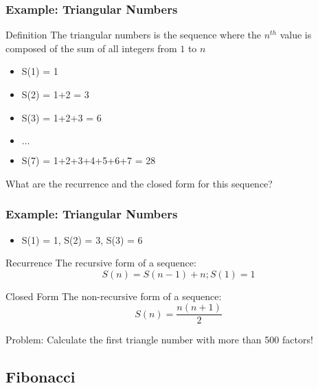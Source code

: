 \documentclass{beamer}
\begin{document}
\begin{frame}
  \frametitle{Example: Triangular Numbers}
  {\smaller
  \begin{block}{Definition}
    The triangular numbers is the sequence where the $n^{th}$ value is
    composed of the sum of all integers from $1$ to $n$
  \end{block}

  \begin{itemize}
  \item S(1) = 1
  \item S(2) = 1+2 = 3
  \item S(3) = 1+2+3 = 6
  \item $\ldots$
  \item S(7) = 1+2+3+4+5+6+7 = 28
  \end{itemize}
  }

  What are the recurrence and the closed form for this sequence?
\end{frame}

\begin{frame}
  \frametitle{Example: Triangular Numbers}
  {\smaller
    \begin{itemize}
    \item S(1) = 1, S(2) = 3, S(3) = 6
    \end{itemize}

    \begin{block}{Recurrence}
      The recursive form of a sequence:
      \begin{equation*}
        S(n) = S(n-1)+n; S(1) = 1
      \end{equation*}
    \end{block}
    \begin{block}{Closed Form}
      The non-recursive form of a sequence:
      \begin{equation*}
        S(n) = \frac{n(n+1)}{2}
      \end{equation*}
    \end{block}
    \alert{Problem:} Calculate the first triangle number with more
    than 500 factors!  }
\end{frame}

\subsection{Fibonacci}
\end{document}
